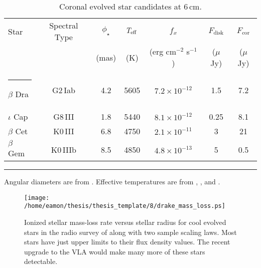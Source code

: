 \begin{table}[hb]
\begin{center}
\caption[Coronal Evolved Star Candidates]{Coronal evolved star candidates at 6\,cm.}
\begin{tabular}{lcccccc}
\hline
\hline
\rule{0pt}{2.5ex}Star &Spectral Type & $\phi _{\star}$  & $T_{\rm{eff}}$ & $f_{x}$  & $F_{\mathrm{disk}}$ &$F_{\mathrm{cor}}$\\
\rule{0pt}{2.5ex}&  & (mas) & (K) & (erg cm$^{-2}$ s$^{-1}$) & ($\mu$Jy)&($\mu$Jy)\\
\hline
\rule{-2.5pt}{2.5ex}	$\beta$ Dra & G2\,Iab &  4.2 & 5605 & $7.2\times 10^{-12}$& 1.5&7.2\\
					$\iota$ Cap & G8\,III &  1.8 & 5440 & $8.1\times 10^{-12}$ & 0.25&8.1\\
					$\beta$ Cet& K0\,III & 6.8 & 4750 & $2.1\times 10^{-11}$& 3&21\\
					$\beta$ Gem & K0\,IIIb & 8.5 & 4850 & $4.8\times 10^{-13}$&5&0.5\\
\hline
\end{tabular}
\label{tab:8.2}
\begin{minipage}{13.0cm}
\rule{-2.5pt}{2.5ex}{\footnotesize Angular diameters are from \cite{fracassini_1981}. Effective temperatures are from \cite{mcwilliam_1990}, \cite{luck_1995}, and \cite{blackwell_1986}.}
\end{minipage}
\end{center}
\end{table}

\begin{figure}[!hb]
\centering 
        \texttt{[image: /home/eamon/thesis/thesis\_template/8/drake\_mass\_loss.ps]}
\caption[Ionized stellar mass-loss rate vs. stellar radius]{Ionized stellar mass-loss rate versus stellar radius for cool evolved stars in the radio survey of \cite{drake_1986} along with two sample scaling laws. Most stars have just upper limits to their flux density values. The recent upgrade to the VLA would make many more of these stars detectable.} 
\label{fig:8.5}
\end{figure}

